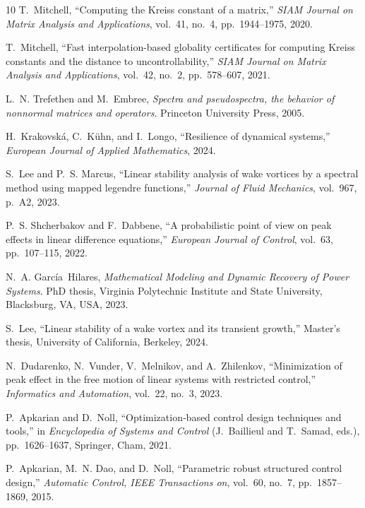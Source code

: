 \documentclass[12pt, a4paper,reqno]{amsart}
\theoremstyle{definition}
\begin{document}
\begin{thebibliography}{10}
T.~Mitchell, ``Computing the {K}reiss constant of a matrix,'' {\em SIAM Journal
  on Matrix Analysis and Applications}, vol.~41, no.~4, pp.~1944--1975, 2020.

T.~Mitchell, ``Fast interpolation-based globality certificates for computing
  {K}reiss constants and the distance to uncontrollability,'' {\em SIAM Journal
  on Matrix Analysis and Applications}, vol.~42, no.~2, pp.~578--607, 2021.

L.~N. Trefethen and M.~Embree, {\em Spectra and pseudospectra, the behavior of
  nonnormal matrices and operators}.
\newblock Princeton University Press, 2005.

H.~Krakovsk{\'a}, C.~K\"uhn, and I.~Longo, ``Resilience of dynamical systems,''
  {\em European Journal of Applied Mathematics}, 2024.

S.~Lee and P.~S. Marcus, ``Linear stability analysis of wake vortices by a
  spectral method using mapped legendre functions,'' {\em Journal of Fluid
  Mechanics}, vol.~967, p.~A2, 2023.

P.~S. Shcherbakov and F.~Dabbene, ``A probabilistic point of view on peak
  effects in linear difference equations,'' {\em European Journal of Control},
  vol.~63, pp.~107--115, 2022.

N.~A. Garc{\'i}a~Hilares, {\em Mathematical Modeling and Dynamic Recovery of
  Power Systems}.
\newblock PhD thesis, Virginia Polytechnic Institute and State University,
  Blacksburg, VA, USA, 2023.

S.~Lee, ``Linear stability of a wake vortex and its transient growth,''
  Master's thesis, University of California, Berkeley, 2024.

N.~Dudarenko, N.~Vunder, V.~Melnikov, and A.~Zhilenkov, ``Minimization of peak
  effect in the free motion of linear systems with restricted control,'' {\em
  Informatics and Automation}, vol.~22, no.~3, 2023.

P.~Apkarian and D.~Noll, ``Optimization‐based control design techniques and
  tools,'' in {\em Encyclopedia of Systems and Control} (J.~Baillieul and
  T.~Samad, eds.), pp.~1626--1637, Springer, Cham, 2021.

P.~Apkarian, M.~N. Dao, and D.~Noll, ``Parametric robust structured control
  design,'' {\em Automatic Control, IEEE Transactions on}, vol.~60, no.~7,
  pp.~1857--1869, 2015.


\end{thebibliography}
\end{document}
